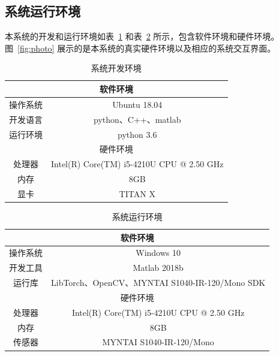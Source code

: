 \subsection{系统运行环境}
本系统的开发和运行环境如表~\ref{tab:env1} 和表~\ref{tab:env2} 所示，包含软件环境和硬件环境。图~\ref{fig:photo} 展示的是本系统的真实硬件环境以及相应的系统交互界面。
\begin{table}[thbp]
	\centering
	\small{}\setlength{}
	\caption{系统开发环境}
	\begin{tabular}{|c|c|}
		\hline
		\multicolumn{2}{|c|}{软件环境}                \\
		\hline
		操作系统   & Ubuntu 18.04 \\
		\hline
		开发语言   & python、C++、matlab \\
		\hline
		运行环境  & python 3.6    \\
		\hline
		\multicolumn{2}{|c|}{硬件环境} \\
		\hline
		处理器    &      Intel(R) Core(TM) i5-4210U CPU @ 2.50 GHz  \\
		\hline
		内存      &       8GB         \\
		\hline
		显卡    &     TITAN X       \\
		\hline
	\end{tabular}
	\label{tab:env1}
\end{table}

\begin{table}[thbp]
	\centering
	\small{}\setlength{}
	\caption{系统运行环境}
	\begin{tabular}{|c|c|}
		\hline
		\multicolumn{2}{|c|}{软件环境}                \\
		\hline
		操作系统   & Windows 10 					  \\
		\hline
		开发工具  & Matlab 2018b  					   \\
		\hline
		运行库   & LibTorch、OpenCV、MYNTAI S1040-IR-120/Mono SDK \\
		\hline
		\multicolumn{2}{|c|}{硬件环境} \\
		\hline
		处理器    &      Intel(R) Core(TM) i5-4210U CPU @ 2.50 GHz  \\
		\hline
		内存      &       8GB         \\
		\hline
		传感器    &     MYNTAI S1040-IR-120/Mono          \\
		\hline
	\end{tabular}
	\label{tab:env2}
\end{table}

